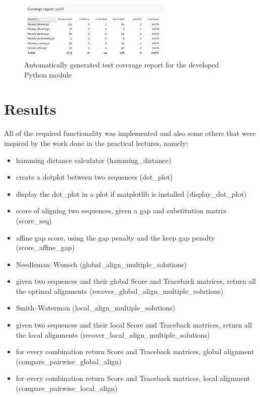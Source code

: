 \documentclass[11pt]{article}
\begin{document}
\begin{figure}[h!]
    \centering
    \includegraphics[width=0.65\textwidth]{coverageReport.png}
    \caption{Automatically generated test coverage report for the developed Python module}
    \label{fig:coverageReport}
\end{figure}

\section{Results}
All of the required functionality was implemented and also some others that were inspired by the work done in the practical lectures, namely:
\begin{itemize}
    \itemsep0em 
    \item hamming distance calculator (hamming\_distance)
    \item create a dotplot between two sequences (dot\_plot)
    \item display the dot\_plot in a plot if matplotlib is installed (display\_dot\_plot)
    \item score of aligning two sequences, given a gap and substitution matrix (score\_seq)
    \item affine gap score, using the gap penalty and the keep gap penalty (score\_affine\_gap)
    \item Needleman–Wunsch (global\_align\_multiple\_solutions)
    \item given two sequences and their global Score and Traceback matrices, return all the optimal alignments (recover\_global\_align\_multiple\_solutions)
    \item Smith–Waterman (local\_align\_multiple\_solutions)
    \item given two sequences and their local Score and Traceback matrices,     return all the local alignments (recover\_local\_align\_multiple\_solutions)
    \item for every combination return Score and Traceback matrices, global alignment (compare\_pairwise\_global\_align)
    \item for every combination return Score and Traceback matrices, local alignment (compare\_pairwise\_local\_align)
\end{itemize}
\end{document}
